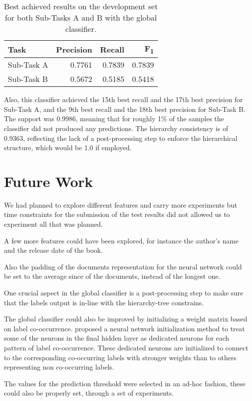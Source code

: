 \documentclass[11pt,a4paper]{article}
\begin{document}
\begin{table}[!h]
\begin{center}
\begin{tabular}{|l|r|r|r|}
\hline\centering\textbf{Task}  & \textbf{Precision} &  \textbf{Recall} &  \textbf{F\textsubscript{1}}\\
\hline
 Sub-Task A   &  0.7761 & 0.7839 & 0.7839 \\
 Sub-Task B   &  0.5672 & 0.5185 & 0.5418 \\
\hline
\end{tabular}
\end{center}
\caption{\label{global_devset-results} Best achieved results on the development
          set for both Sub-Tasks A and B with the global classifier.}
\end{table}

Also, this classifier achieved the 15th best recall and the 17th best precision
for Sub-Task A, and the 9th best recall and the 18th best precision for Sub-Task B.
The support was 0.9986, meaning that for roughly 1\% of the samples the classifier
did not produced any predictions. The hierarchy consistency is of 0.9363, reflecting
the lack of a post-processing step to enforce the hierarchical structure,
which would be 1.0 if employed.

\section{Future Work}\label{future}

We had planned to explore different features and carry more experiments but time
constraints for the submission of the test results did not allowed us to experiment
all that was planned.

A few more features could have been explored, for instance the author's name
and the release date of the book.

Also the padding of the documents representation for the neural network could be
set to the average since of the documents, instead of the longest one.

One crucial aspect in the global classifier is a post-processing step to make
sure that the labels output is in-line with the hierarchy-tree constrains.

The global classifier could also be improved by initializing a weight matrix
based on label co-occurrence. \citet{kurata-etal-2016-improved} proposed a neural
network initialization method to treat some of the neurons in the final hidden
layer as dedicated neurons for each pattern of label co-occurrence. These dedicated
neurons are initialized to connect to the corresponding co-occurring labels with
stronger weights than to others representing non co-occurring labels.

The values for the prediction threshold were selected in an ad-hoc fashion, these
could also be properly set, through a set of experiments.



\end{document}
